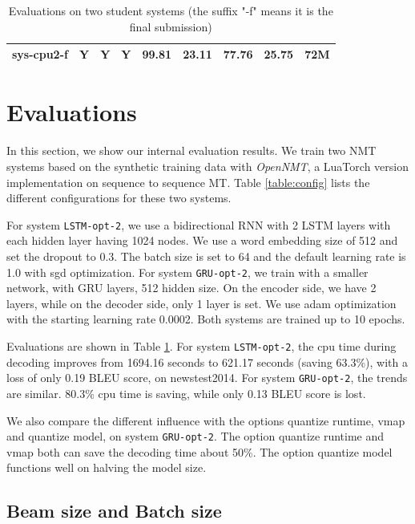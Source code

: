 \documentclass[11pt,a4paper]{article}
\begin{document}
\begin{table}[]
\begin{tabular}{lcccccccc}
sys-cpu2-f          & Y                                                                           & Y                     & Y                                                                         & 99.81                & 23.11     & 77.76                & 25.75     & 72M                         \\ \hline
\end{tabular}
\caption{Evaluations on two student systems (the suffix "-f" means it is the final submission)}
\label{table:student}
\end{table}

\section{Evaluations}

In this section, we show our internal evaluation results.
We train two NMT systems based on the synthetic training data with \textit{OpenNMT}, a LuaTorch version implementation on sequence to sequence MT. Table \ref{table:config} lists the different configurations for these two systems.

For system {\tt LSTM-opt-2}, we use a bidirectional RNN with 2 LSTM layers with each hidden layer having 1024 nodes.
We use a word embedding size of 512 and set the dropout to 0.3.
The batch size is set to 64 and the default learning rate is 1.0 with sgd optimization.
For system {\tt GRU-opt-2}, we train with a smaller network, with GRU layers, 512 hidden size.
On the encoder side, we have 2 layers, while on the decoder side, only 1 layer is set.
We use adam optimization with the starting learning rate 0.0002.
Both systems are trained up to 10 epochs.

Evaluations are shown in Table \ref{table:student}.
For system {\tt LSTM-opt-2}, the cpu time during decoding improves from 1694.16 seconds to 621.17 seconds (saving 63.3\%), with a loss of only 0.19 BLEU score, on newstest2014.
For system {\tt GRU-opt-2}, the trends are similar.
80.3\% cpu time is saving, while only 0.13 BLEU score is lost.

We also compare the different influence with the options quantize runtime, vmap and quantize model, on system {\tt GRU-opt-2}.
The option quantize runtime and vmap both can save the decoding time about 50\%.
The option quantize model functions well on halving the model size.

\subsection{Beam size and Batch size}
\end{document}
